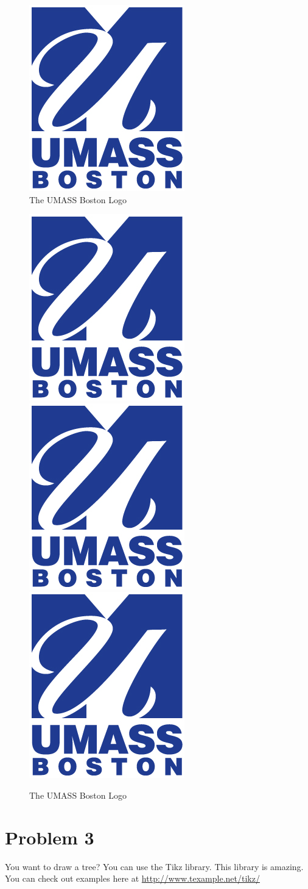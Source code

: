 \documentclass[12pt,letterpaper]{article}
\begin{document}
\begin{figure}[h]
\begin{center}
\includegraphics[width=.2\textwidth]{umass-boston-logo.png}
\caption{The UMASS Boston Logo}
\label{fig:umblogo}
\end{center}
\end{figure} 

\begin{figure}[h]
\begin{center}
\includegraphics[width=.2\textwidth]{umass-boston-logo.png}
\includegraphics[width=.2\textwidth]{umass-boston-logo.png}
\includegraphics[width=.2\textwidth]{umass-boston-logo.png}
\caption{The UMASS Boston Logo}
\label{fig:3umblogo}
\end{center}
\end{figure} 

\newpage
\section*{Problem 3}

You want to draw a tree?  You can use the Tikz library. This library is amazing.
You can check out examples here at \url{http://www.texample.net/tikz/}
\end{document}
